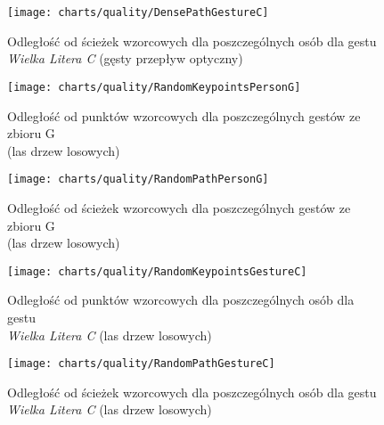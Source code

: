     \begin{figure}[!ht]
      \centering
      \texttt{[image: charts/quality/DensePathGestureC]}
      \caption[Odległość od ścieżek wzorcowych dla poszczególnych osób dla gestu C]
              {Odległość od ścieżek wzorcowych dla poszczególnych osób dla gestu\\\textit{Wielka Litera C} (gęsty przepływ optyczny)}
      \label{fig:DensePathGestureC}
    \end{figure}

    \newpage
    \begin{figure}[!ht]
      \centering
      \texttt{[image: charts/quality/RandomKeypointsPersonG]}
      \caption[Odległość od punktów wzorcowych dla poszczególnych gestów]
              {Odległość od punktów wzorcowych dla poszczególnych gestów ze zbioru G\\(las drzew losowych)}
      \label{fig:RandomKeypointsPersonG}
    \end{figure}

    \begin{figure}[!ht]
      \centering
      \texttt{[image: charts/quality/RandomPathPersonG]}
      \caption[Odległość od ścieżek wzorcowych dla poszczególnych gestów]
              {Odległość od ścieżek wzorcowych dla poszczególnych gestów ze zbioru G\\(las drzew losowych)}
      \label{fig:RandomPathPersonG}
    \end{figure}

    \newpage
    \begin{figure}[!ht]
      \centering
      \texttt{[image: charts/quality/RandomKeypointsGestureC]}
      \caption[Odległość od punktów wzorcowych dla poszczególnych osób dla gestu C]
              {Odległość od punktów wzorcowych dla poszczególnych osób dla gestu\\\textit{Wielka Litera C} (las drzew losowych)}
      \label{fig:RandomKeypointsGestureC}
    \end{figure}

    \begin{figure}[!ht]
      \centering
      \texttt{[image: charts/quality/RandomPathGestureC]}
      \caption[Odległość od ścieżek wzorcowych dla poszczególnych osób dla gestu C]
              {Odległość od ścieżek wzorcowych dla poszczególnych osób dla gestu\\\textit{Wielka Litera C} (las drzew losowych)}
      \label{fig:RandomPathGestureC}
    \end{figure}


